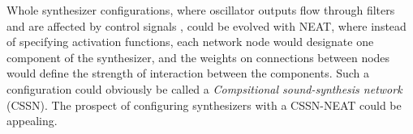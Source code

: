 \documentclass[conference]{IEEEtran}
\begin{document}
Whole synthesizer configurations, where oscillator outputs flow through filters and are affected by control signals \cite{Principles-of-Music-Synthesis}, could be evolved with NEAT, where instead of specifying activation functions, each network node would designate one component of the synthesizer, and the weights on connections between nodes would define the strength of interaction between the components.  Such a configuration could obviously be called a \textit{Compsitional sound-synthesis network} (CSSN).  The prospect of configuring synthesizers with a CSSN-NEAT could be appealing.






%
%
%
%









%
%
%



\end{document}
